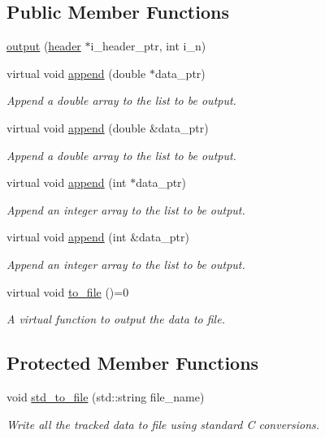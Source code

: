 \subsection*{Public Member Functions}
\begin{DoxyCompactItemize}
\item 
\hyperlink{classio_1_1output_af2cf6a328dfae9737484dc52cb804a6e}{output} (\hyperlink{classio_1_1header}{header} $\ast$i\-\_\-header\-\_\-ptr, int i\-\_\-n)
\item 
virtual void \hyperlink{classio_1_1output_a3dc7c5cc8f0d374d41813c5496a04d7b}{append} (double $\ast$data\-\_\-ptr)
\begin{DoxyCompactList}\small\item\em Append a double array to the list to be output. \end{DoxyCompactList}\item 
virtual void \hyperlink{classio_1_1output_ad77598d1587f724cb928429cbf10d4dd}{append} (double \&data\-\_\-ptr)
\begin{DoxyCompactList}\small\item\em Append a double array to the list to be output. \end{DoxyCompactList}\item 
virtual void \hyperlink{classio_1_1output_a206f90ef42584c60efb44276fd2c691d}{append} (int $\ast$data\-\_\-ptr)
\begin{DoxyCompactList}\small\item\em Append an integer array to the list to be output. \end{DoxyCompactList}\item 
virtual void \hyperlink{classio_1_1output_a39a20cad9edf52ed505efe82726adb92}{append} (int \&data\-\_\-ptr)
\begin{DoxyCompactList}\small\item\em Append an integer array to the list to be output. \end{DoxyCompactList}\item 
virtual void \hyperlink{classio_1_1output_aae295dd37ca6397fcf8c2109f2c0e418}{to\-\_\-file} ()=0
\begin{DoxyCompactList}\small\item\em A virtual function to output the data to file. \end{DoxyCompactList}\end{DoxyCompactItemize}
\subsection*{Protected Member Functions}
\begin{DoxyCompactItemize}
\item 
void \hyperlink{classio_1_1output_a99f92e423caae7ceb24f4da88b3572ff}{std\-\_\-to\-\_\-file} (std\-::string file\-\_\-name)
\begin{DoxyCompactList}\small\item\em Write all the tracked data to file using standard C conversions. \end{DoxyCompactList}\end{DoxyCompactItemize}
